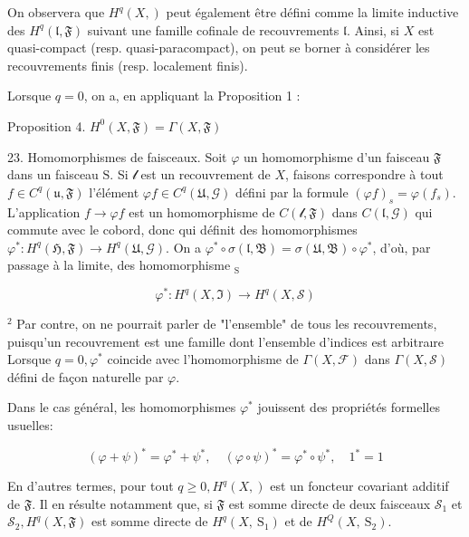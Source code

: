 On observera que $H^{q}(X, \mathfrak{})$ peut également être défini comme la limite inductive des $H^{q}(\mathfrak{l}, \mathfrak{F})$ suivant une famille cofinale de recouvrements $\mathfrak{l}$. Ainsi, si $X$ est quasi-compact (resp. quasi-paracompact), on peut se borner à considérer les recouvrements finis (resp. localement finis).

Lorsque $q=0$, on a, en appliquant la Proposition 1 :

Proposition 4. $H^{0}(X, \mathfrak{F})=\Gamma(X, \mathfrak{F})$

23. Homomorphismes de faisceaux. Soit $\varphi$ un homomorphisme d'un faisceau $\mathfrak{F}$ dans un faisceau $\mathrm{S}$. Si $\mathcal{l}$ est un recouvrement de $X$, faisons correspondre à tout $f \in C^{q}(\mathfrak{u}, \mathfrak{F})$ l'élément $\varphi f \in C^{q}(\mathfrak{U}, \mathcal{G})$ défini par la formule $(\varphi f)_{s}=\varphi\left(f_{s}\right) .$ L'application $f \rightarrow \varphi f$ est un homomorphisme de $C(\mathcal{l}, \mathfrak{F})$ dans $C(\mathfrak{l}, \mathcal{G})$ qui commute avec le cobord, donc qui définit des homomorphismes $\varphi^{*}: H^{q}(\mathfrak{H}, \mathfrak{F}) \rightarrow H^{q}(\mathfrak{U}, \mathcal{G})$. On a $\varphi^{*} \circ \sigma(\mathfrak{l}, \mathfrak{B})=\sigma(\mathfrak{U}, \mathfrak{B}) \circ \varphi^{*}$, d'où, par passage à la limite, des homomorphisme $_{\mathrm{S}}$

$$
\varphi^{*}: H^{q}(X, \Im) \rightarrow H^{q}(X, \mathcal{S})
$$

${ }^{2}$ Par contre, on ne pourrait parler de "l'ensemble" de tous les recouvrements, puisqu'un recouvrement est une famille dont l'ensemble d'indices est arbitraıre Lorsque $q=0, \varphi^{*}$ coincide avec l'homomorphisme de $\Gamma(X, \mathcal{F})$ dans $\Gamma(X, \mathcal{S})$ défini de façon naturelle par $\varphi$.

Dans le cas général, les homomorphismes $\varphi^{*}$ jouissent des propriétés formelles usuelles:

$$
(\varphi+\psi)^{*}=\varphi^{*}+\psi^{*}, \quad(\varphi \circ \psi)^{*}=\varphi^{*} \circ \psi^{*}, \quad 1^{*}=1
$$

En d'autres termes, pour tout $q \geq 0, H^{q}(X, \mathscr{})$ est un foncteur covariant additif de $\mathfrak{F} .$ Il en résulte notamment que, si $\mathfrak{F}$ est somme directe de deux faisceaux $\mathcal{S}_{1}$ et $\mathcal{S}_{2}, H^{q}(X, \mathfrak{F})$ est somme directe de $H^{q}\left(X, \mathrm{~S}_{1}\right)$ et de $H^{Q}\left(X, \mathrm{~S}_{2}\right)$.

